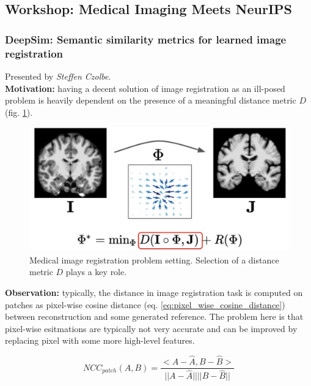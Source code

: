 \subsection{Workshop: Medical Imaging Meets NeurIPS}

\subsubsection{DeepSim: Semantic similarity metrics for learned image registration \cite{abs-2011-05735}}

Presented by \textit{Steffen Czolbe}. \\

{\bf Motivation:} having a decent solution of image registration as an ill-posed problem is heavily dependent on the presence of a meaningful distance metric $D$ (fig. \ref{fig:image_reg_problem_setting}). \\

\begin{figure}[!h]
    \centering
    \includegraphics[scale=0.4]{neurips-2020/images/Screenshot 2020-12-15 at 16.48.59.png}
    \caption{Medical image registration problem setting. Selection of a distance metric $D$ plays a key role.}
    \label{fig:image_reg_problem_setting}
\end{figure}

{\bf Observation:} typically, the distance in image registration task is computed on patches as pixel-wise cosine distance (eq. \ref{eq:pixel_wise_cosine_distance}) between reconstruction and some generated reference.
The problem here is that pixel-wise esitmations are typically not very accurate and can be improved by replacing pixel with some more high-level features.

\begin{equation}
    NCC_{patch} (A, B) = \frac{<A - \hat{A}, B - \hat{B}>}{|| A - \hat{A} || || B - \hat{B} ||}
    \label{eq:pixel_wise_cosine_distance}
\end{equation}

